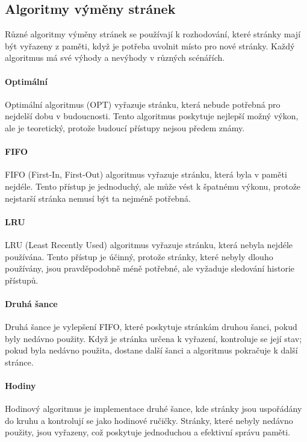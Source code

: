 \subsection{Algoritmy výměny stránek}

Různé algoritmy výměny stránek se používají k rozhodování, které stránky mají být vyřazeny z paměti, když je potřeba uvolnit místo pro nové stránky. Každý algoritmus má své výhody a nevýhody v různých scénářích.

\paragraph{Optimální}
Optimální algoritmus (OPT) vyřazuje stránku, která nebude potřebná pro nejdelší dobu v budoucnosti. Tento algoritmus poskytuje nejlepší možný výkon, ale je teoretický, protože budoucí přístupy nejsou předem známy.

\paragraph{FIFO}
FIFO (First-In, First-Out) algoritmus vyřazuje stránku, která byla v paměti nejdéle. Tento přístup je jednoduchý, ale může vést k špatnému výkonu, protože nejstarší stránka nemusí být ta nejméně potřebná.

\paragraph{LRU}
LRU (Least Recently Used) algoritmus vyřazuje stránku, která nebyla nejdéle používána. Tento přístup je účinný, protože stránky, které nebyly dlouho používány, jsou pravděpodobně méně potřebné, ale vyžaduje sledování historie přístupů.

\paragraph{Druhá šance}
Druhá šance je vylepšení FIFO, které poskytuje stránkám druhou šanci, pokud byly nedávno použity. Když je stránka určena k vyřazení, kontroluje se její stav; pokud byla nedávno použita, dostane další šanci a algoritmus pokračuje k další stránce.

\paragraph{Hodiny}
Hodinový algoritmus je implementace druhé šance, kde stránky jsou uspořádány do kruhu a kontrolují se jako hodinové ručičky. Stránky, které nebyly nedávno použity, jsou vyřazeny, což poskytuje jednoduchou a efektivní správu paměti.

